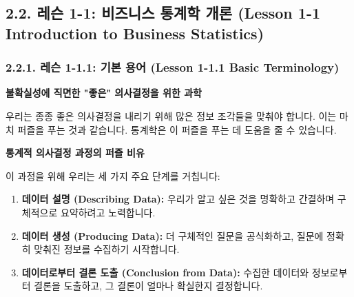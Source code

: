 \documentclass[11pt,a4paper]{book}
\providecommand{\captionof}[2]{\textbf{#2}}
\theoremstyle{definition}
\begin{document}
\subsection{2.2. 레슨 1-1: 비즈니스 통계학 개론 (Lesson 1-1 Introduction to Business Statistics)}

\subsubsection{2.2.1. 레슨 1-1.1: 기본 용어 (Lesson 1-1.1 Basic Terminology)}

\begin{tcolorbox}[title={비즈니스 통계학 (Business Statistics)}]
\textbf{불확실성에 직면한 "좋은" 의사결정을 위한 과학}

우리는 종종 좋은 의사결정을 내리기 위해 많은 정보 조각들을 맞춰야 합니다. 이는 마치 퍼즐을 푸는 것과 같습니다. 통계학은 이 퍼즐을 푸는 데 도움을 줄 수 있습니다.

\begin{center}
\captionof{figure}{통계적 의사결정 과정의 퍼즐 비유}
\label{fig:puzzle}
\end{center}

이 과정을 위해 우리는 세 가지 주요 단계를 거칩니다:
\begin{enumerate}
    \item \textbf{데이터 설명 (Describing Data):} 우리가 알고 싶은 것을 명확하고 간결하며 구체적으로 요약하려고 노력합니다.
    \item \textbf{데이터 생성 (Producing Data):} 더 구체적인 질문을 공식화하고, 질문에 정확히 맞춰진 정보를 수집하기 시작합니다.
    \item \textbf{데이터로부터 결론 도출 (Conclusion from Data):} 수집한 데이터와 정보로부터 결론을 도출하고, 그 결론이 얼마나 확실한지 결정합니다.
\end{enumerate}
\end{tcolorbox}
\end{document}
